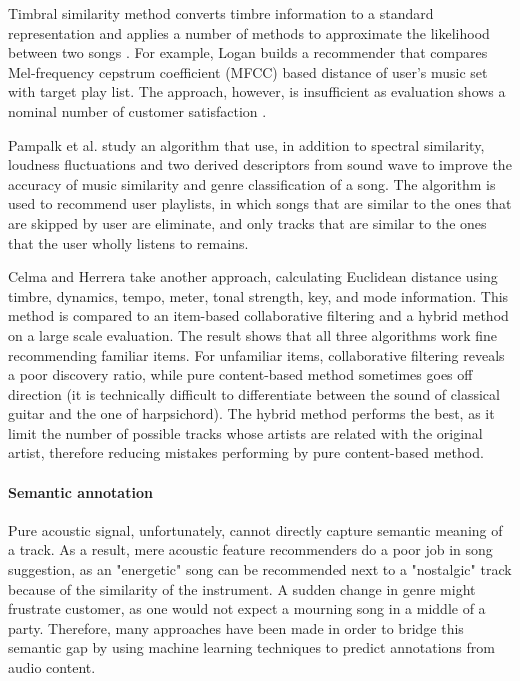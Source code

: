 Timbral similarity method converts timbre information to a standard representation and applies a number of methods to approximate the likelihood between two songs \cite{aucouturier2005way} \cite{logan2001music}. For example, Logan \cite{logan2004music} builds a recommender that compares Mel-frequency cepstrum coefficient (MFCC) based distance of user's music set with target play list. The approach, however, is insufficient as evaluation shows a nominal number of customer satisfaction \cite{bogdanov2013semantic}. 

Pampalk et al. \cite{pampalk2005improvements} \cite{pampalk2005dynamic} study an algorithm that use, in addition to spectral similarity, loudness fluctuations and two derived descriptors from sound wave to improve the accuracy of music similarity and genre classification of a song. The algorithm is used to recommend user playlists, in which songs that are similar to the ones that are skipped by user are eliminate, and only tracks that are similar to the ones that the user wholly listens to remains.

Celma and Herrera \cite{celma2008new} take another approach, calculating Euclidean distance using timbre, dynamics, tempo, meter, tonal strength, key, and mode information. This method is compared to an item-based collaborative filtering and a hybrid method on a large scale evaluation. The result shows that all three algorithms work fine recommending familiar items. For unfamiliar items, collaborative filtering reveals a poor discovery ratio, while pure content-based method sometimes goes off direction (it is technically difficult to differentiate between the sound of classical guitar and the one of harpsichord). The hybrid method performs the best, as it limit the number of possible tracks whose artists are related with the original artist, therefore reducing mistakes performing by pure content-based method.

\paragraph{Semantic annotation}
Pure acoustic signal, unfortunately, cannot directly capture semantic meaning of a track. As a result, mere acoustic feature recommenders do a poor job in song suggestion, as an "energetic" song can be recommended next to a "nostalgic" track because of the similarity of the instrument. A sudden change in genre might frustrate customer, as one would not expect a mourning song in a middle of a party. Therefore, many approaches have been made in order to bridge this semantic gap by using machine learning techniques to predict annotations from audio content.

